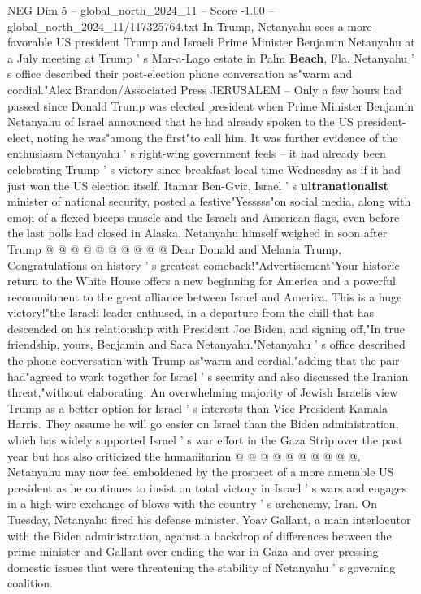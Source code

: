 \begin{textsample}{NEG Dim 5 – global\_north\_2024\_11 – Score -1.00 – global\_north\_2024\_11/117325764.txt}  \label{ex:f5_neg_421}
In Trump, Netanyahu sees a more favorable US president Trump and Israeli Prime Minister Benjamin Netanyahu at a July meeting at Trump ' s Mar-a-Lago estate in Palm \textbf{Beach}, Fla.
Netanyahu ' s office described their post-election phone conversation as"warm and cordial."Alex Brandon/Associated Press JERUSALEM -- Only a few hours had passed since Donald Trump was elected president when Prime Minister Benjamin Netanyahu of Israel announced that he had already spoken to the US president-elect, noting he was"among the first"to call him.
It was further evidence of the enthusiasm Netanyahu ' s right-wing government feels -- it had already been celebrating Trump ' s victory since breakfast local time Wednesday as if it had just won the US election itself.
Itamar Ben-Gvir, Israel ' s \textbf{ultranationalist} minister of national security, posted a festive"Yesssss"on social media, along with emoji of a flexed biceps muscle and the Israeli and American flags, even before the last polls had closed in Alaska.
Netanyahu himself weighed in soon after Trump @ @ @ @ @ @ @ @ @ @ Dear Donald and Melania Trump, Congratulations on history ' s greatest comeback!"Advertisement"Your historic return to the White House offers a new beginning for America and a powerful recommitment to the great alliance between Israel and America.
This is a huge victory!"the Israeli leader enthused, in a departure from the chill that has descended on his relationship with President Joe Biden, and signing off,"In true friendship, yours, Benjamin and Sara Netanyahu."Netanyahu ' s office described the phone conversation with Trump as"warm and cordial,"adding that the pair had"agreed to work together for Israel ' s security and also discussed the Iranian threat,"without elaborating.
An overwhelming majority of Jewish Israelis view Trump as a better option for Israel ' s interests than Vice President Kamala Harris.
They assume he will go easier on Israel than the Biden administration, which has widely supported Israel ' s war effort in the Gaza Strip over the past year but has also criticized the humanitarian @ @ @ @ @ @ @ @ @ @.
Netanyahu may now feel emboldened by the prospect of a more amenable US president as he continues to insist on total victory in Israel ' s wars and engages in a high-wire exchange of blows with the country ' s archenemy, Iran.
On Tuesday, Netanyahu fired his defense minister, Yoav Gallant, a main interlocutor with the Biden administration, against a backdrop of differences between the prime minister and Gallant over ending the war in Gaza and over pressing domestic issues that were threatening the stability of Netanyahu ' s governing coalition.

\end{textsample}
